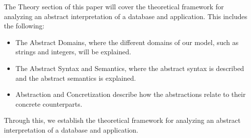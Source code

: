 The Theory section of this paper will cover the theoretical framework for analyzing an abstract interpretation of a database and application.
This includes the following:

\begin{itemize}
    \item The Abstract Domains, where the different domains of our model, such as strings and integers, will be explained.
    \item The Abstract Syntax and Semantics, where the abstract syntax is described and the abstract semantics is explained.
    \item Abstraction and Concretization describe how the abstractions relate to their concrete counterparts.
\end{itemize}

Through this, we establish the theoretical framework for analyzing an abstract interpretation of a database and application.
